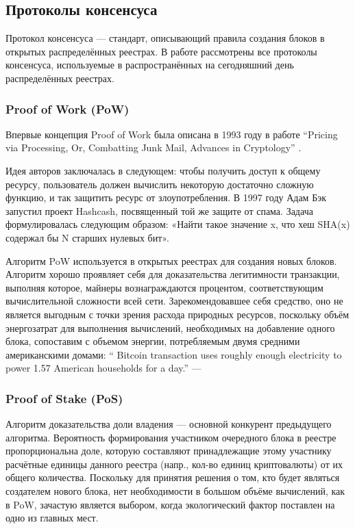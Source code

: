 \subsection{Протоколы консенсуса}\label{consensus_protocols}
Протокол консенсуса --- стандарт, описывающий правила создания блоков в
открытых распределённых реестрах. В работе рассмотрены все протоколы
консенсуса, используемые в распространённых на сегодняшний день распределённых
реестрах.
\subsubsection{Proof of Work (PoW)}\label{pow}
Впервые концепция Proof of Work была описана в 1993 году в работе ``Pricing via
Processing, Or, Combatting Junk Mail, Advances in Cryptology''
\cite{Dwork2007}.

Идея авторов заключалась в следующем: чтобы получить доступ к общему ресурсу,
пользователь должен вычислить некоторую достаточно сложную функцию, и так
защитить ресурс от злоупотребления.  В 1997 году Адам Бэк запустил проект
Hashcash, посвященный той же защите от спама. Задача формулировалась следующим
образом: «Найти такое значение x, что хеш SHA(x) содержал бы N старших нулевых
бит».

Алгоритм PoW используется в открытых реестрах
для создания новых блоков. Алгоритм хорошо проявляет себя для доказательства
легитимности транзакции, выполняя которое, майнеры вознаграждаются процентом,
соответствующим вычислительной сложности всей сети. Зарекомендовавшее себя
средство, оно не является выгодным с точки зрения расхода природных ресурсов,
поскольку объём энергозатрат для выполнения вычислений, необходимых на
добавление одного блока, сопоставим с объемом энергии, потребляемым двумя
средними американскими домами: `` Bitcoin transaction uses roughly enough
electricity to power 1.57 American households for a day.'' --- \cite{amhouses}

\subsubsection{Proof of Stake (PoS)}
Алгоритм доказательства доли владения --- основной конкурент предыдущего
алгоритма. Вероятность формирования участником очередного блока в реестре
пропорциональна доле, которую составляют принадлежащие этому участнику
расчётные единицы данного реестра (напр., кол-во единиц криптовалюты) от их
общего количества. Поскольку для принятия решения о том, кто будет являться
создателем нового блока, нет необходимости в большом объёме вычислений, как в
PoW, зачастую является выбором, когда экологический фактор поставлен на одно из
главных мест.

